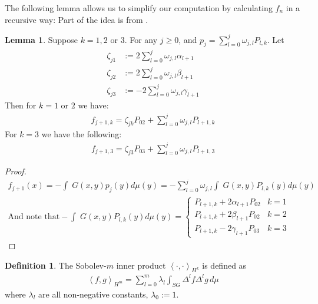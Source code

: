 \documentclass[12pt]{amsart}
\theoremstyle{plain}
\theoremstyle{definition}
\newtheorem{lemma}{Lemma}[section]
\newtheorem{definition}{Definition}[section]
\newcommand{\inner}[2]{\left \langle #1, #2\right \rangle}
\newcommand{\lap}{\Delta}
\begin{document}
The following lemma allows us to simplify our computation by calculating $f_n$ in a recursive way:
Part of the idea is from \cite{OST}.
\begin{lemma}\label{Lemma: Expansions for zeta}
Suppose $k= 1,2$ or $3$. For any $j\geq 0$, and $p_j=\sum\limits_{l=0}^j\omega_{j,l}P_{l,k}$. Let \medskip
\begin{align}
    \zeta_{j1} &:=2\sum\limits_{l=0}^j\omega_{j,l}\alpha_{l+1} \label{zetaj1} \\ 
    \zeta_{j2} &:=2\sum\limits_{l=0}^j\omega_{j,l}\beta_{l+1} \label{zetaj2} \\ 
    \zeta_{j3} &:=-2\sum\limits_{l=0}^j\omega_{j,l}\gamma_{l+1} \label{zetaj3}
\end{align}
Then for $k=1$ or $2$ we have: 
\begin{align}
    f_{j+1,k}=\zeta_{jk}P_{02}+\sum\limits_{l=0}^j \omega_{j,l}P_{l+1,k} \label{ftfor12}
\end{align}
For $k=3$ we have the following: 
\begin{align}
    f_{j+1,3}=\zeta_{j3}P_{03}+\sum\limits_{l=0}^j \omega_{j,l}P_{l+1,3} \label{ftfor3}
\end{align}
\end{lemma}
\begin{proof}
\begin{align}
f_{j+1}(x)=-\int \;G(x,y)p_j(y)d\mu(y)=-\sum\limits^j_{l=0}\omega_{j,l}\int\; G(x,y)P_{l,k}(y)d\mu(y)\\
\textrm{And note that} -\int\; G(x,y)P_{l,k}(y)d\mu(y)= \begin{cases}P_{l+1,k}+2\alpha_{l+1}P_{02}&k=1\\
P_{l+1,k}+2\beta_{l+1}P_{02}&k=2\\
P_{l+1,k}-2\gamma_{l+1}P_{03}&k=3
\end{cases}
\end{align}
\end{proof}
\begin{definition} \label{def:inner}The Sobolev-$m$ inner product $\inner{\cdot}{\cdot}_{H^k}$ is defined as
\begin{gather}
    \inner{f}{g}_{H^m} = \sum\limits_{l = 0}^m \lambda_l\int_{SG}\lap^lf\lap^lg\,d\mu
    \label{eq:sobk}
\end{gather}
 where $\lambda_l$ are all non-negative constants, $\lambda_0:=1$.
\end{definition}
\end{document}
